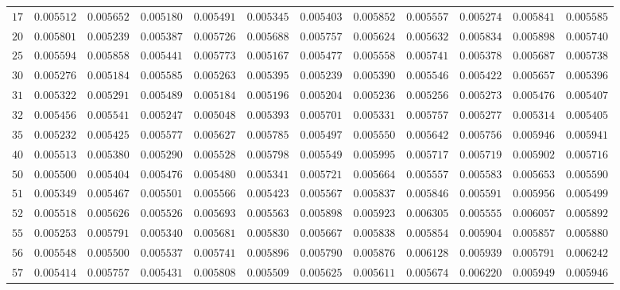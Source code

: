 \begin{sidewaystable}
\begin{tabular}{r|rrrrrrrrrrr}
$17$ & $0.005512$ & $0.005652$ & $0.005180$ & $0.005491$ & $0.005345$ & $0.005403$ & $0.005852$ & $0.005557$ & $0.005274$ & $0.005841$ & $0.005585$ \\
$20$ & $0.005801$ & $0.005239$ & $0.005387$ & $0.005726$ & $0.005688$ & $0.005757$ & $0.005624$ & $0.005632$ & $0.005834$ & $0.005898$ & $0.005740$ \\
$25$ & $0.005594$ & $0.005858$ & $0.005441$ & $0.005773$ & $0.005167$ & $0.005477$ & $0.005558$ & $0.005741$ & $0.005378$ & $0.005687$ & $0.005738$ \\
$30$ & $0.005276$ & $0.005184$ & $0.005585$ & $0.005263$ & $0.005395$ & $0.005239$ & $0.005390$ & $0.005546$ & $0.005422$ & $0.005657$ & $0.005396$ \\
$31$ & $0.005322$ & $0.005291$ & $0.005489$ & $0.005184$ & $0.005196$ & $0.005204$ & $0.005236$ & $0.005256$ & $0.005273$ & $0.005476$ & $0.005407$ \\
$32$ & $0.005456$ & $0.005541$ & $0.005247$ & $0.005048$ & $0.005393$ & $0.005701$ & $0.005331$ & $0.005757$ & $0.005277$ & $0.005314$ & $0.005405$ \\
$35$ & $0.005232$ & $0.005425$ & $0.005577$ & $0.005627$ & $0.005785$ & $0.005497$ & $0.005550$ & $0.005642$ & $0.005756$ & $0.005946$ & $0.005941$ \\
$40$ & $0.005513$ & $0.005380$ & $0.005290$ & $0.005528$ & $0.005798$ & $0.005549$ & $0.005995$ & $0.005717$ & $0.005719$ & $0.005902$ & $0.005716$ \\
$50$ & $0.005500$ & $0.005404$ & $0.005476$ & $0.005480$ & $0.005341$ & $0.005721$ & $0.005664$ & $0.005557$ & $0.005583$ & $0.005653$ & $0.005590$ \\
$51$ & $0.005349$ & $0.005467$ & $0.005501$ & $0.005566$ & $0.005423$ & $0.005567$ & $0.005837$ & $0.005846$ & $0.005591$ & $0.005956$ & $0.005499$ \\
$52$ & $0.005518$ & $0.005626$ & $0.005526$ & $0.005693$ & $0.005563$ & $0.005898$ & $0.005923$ & $0.006305$ & $0.005555$ & $0.006057$ & $0.005892$ \\
$55$ & $0.005253$ & $0.005791$ & $0.005340$ & $0.005681$ & $0.005830$ & $0.005667$ & $0.005838$ & $0.005854$ & $0.005904$ & $0.005857$ & $0.005880$ \\
$56$ & $0.005548$ & $0.005500$ & $0.005537$ & $0.005741$ & $0.005896$ & $0.005790$ & $0.005876$ & $0.006128$ & $0.005939$ & $0.005791$ & $0.006242$ \\
$57$ & $0.005414$ & $0.005757$ & $0.005431$ & $0.005808$ & $0.005509$ & $0.005625$ & $0.005611$ & $0.005674$ & $0.006220$ & $0.005949$ & $0.005946$ \\

\end{tabular}
\end{sidewaystable}
